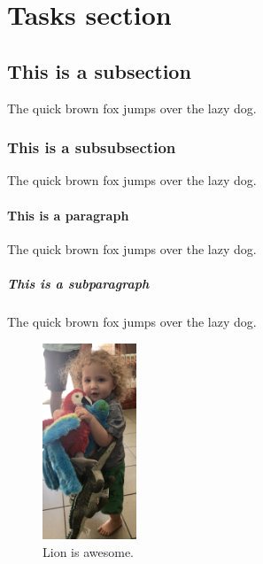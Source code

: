 \documentclass{article}
\begin{document}
\section{Tasks section}

\lipsum[1]
\lipsum[2]
\lipsum[3]
\lipsum[4]


\subsection{This is a subsection}
The quick brown fox jumps over the lazy dog.

\subsubsection{This is a subsubsection}
The quick brown fox jumps over the lazy dog.

\paragraph{This is a paragraph}
The quick brown fox jumps over the lazy dog.

\subparagraph{This is a subparagraph}
The quick brown fox jumps over the lazy dog.

\begin{figure}[h!!!]
\centering
\includegraphics[width=0.25\textwidth]{lion_parrots.JPG}
  \caption{Lion is awesome.}
\label{fig:lion}
\end{figure}
\eject
\end{document}

